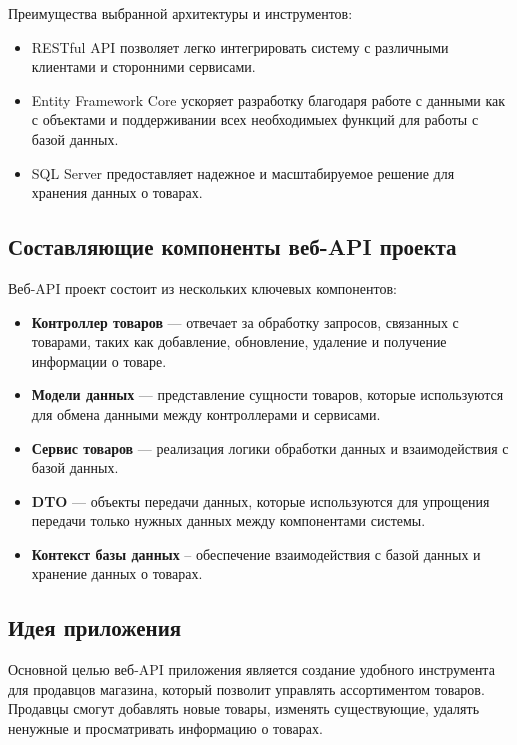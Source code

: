 \documentclass[a4paper,12pt]{report}
\begin{document}
Преимущества выбранной архитектуры и инструментов:
\begin{itemize}
  \item
      \acs{REST}ful \acs{API} позволяет легко интегрировать систему с различными клиентами и сторонними сервисами.
  \item 
      Entity Framework Core ускоряет разработку благодаря работе с данными как с объектами и поддерживании всех необходимыех функций для работы с базой данных.
  \item
      \acs{SQL} Server предоставляет надежное и масштабируемое решение для хранения данных о товарах.
\end{itemize}

\subsection{Составляющие компоненты веб-\acs{API} проекта}

Веб-\acs{API} проект состоит из нескольких ключевых компонентов:
\begin{itemize}
  \item
  \textbf{Контроллер товаров} --- отвечает за обработку запросов, связанных с товарами, таких как добавление, обновление, удаление и получение информации о товаре.
  \item 
  \textbf{Модели данных} --- представление сущности товаров, которые используются для обмена данными между контроллерами и сервисами.
  \item
  \textbf{Сервис товаров} --- реализация логики обработки данных и взаимодействия с базой данных.
  \item
  \textbf{\acs{DTO}} --- объекты передачи данных, которые используются для упрощения передачи только нужных данных между компонентами системы.
  \item
  \textbf{Контекст базы данных} -- обеспечение взаимодействия с базой данных и хранение данных о товарах.
\end{itemize}

\subsection{Идея приложения}

Основной целью веб-\acs{API} приложения является создание удобного инструмента для продавцов магазина, 
который позволит управлять ассортиментом товаров. Продавцы смогут добавлять новые товары, 
изменять существующие, удалять ненужные и просматривать информацию о товарах.
\end{document}
